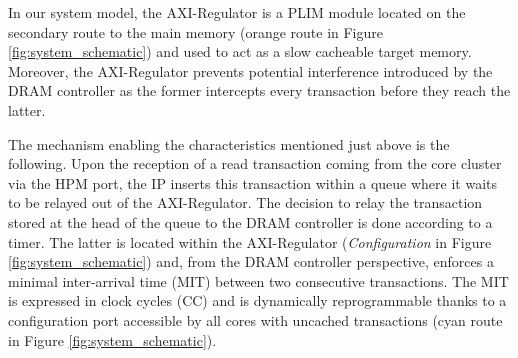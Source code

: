 %

    In our system model, the AXI-Regulator is a PLIM module \cite{PLIM20} located on the secondary route to the main memory (orange route in Figure \ref{fig:system_schematic}) and used to act as a slow cacheable target memory.
    Moreover, the AXI-Regulator prevents potential interference introduced by the DRAM controller as the former intercepts every transaction before they reach the latter.

    The mechanism enabling the characteristics mentioned just above is the following.
    Upon the reception of a read transaction coming from the core cluster via the HPM port, the IP inserts this transaction within a queue where it waits to be relayed out of the AXI-Regulator.
    The decision to relay the transaction stored at the head of the queue to the DRAM controller is done according to a timer.
    The latter is located within the AXI-Regulator (\emph{Configuration} in Figure \ref{fig:system_schematic}) and, from the DRAM controller perspective, enforces a minimal inter-arrival time (MIT) between two consecutive transactions.
    The MIT is expressed in clock cycles (CC) and is dynamically reprogrammable thanks to a configuration port accessible by all cores with uncached transactions (cyan route in Figure \ref{fig:system_schematic}).
